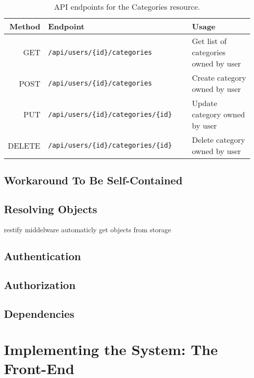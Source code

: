 		\begin{table}
			\begin{tabularx}{\textwidth}{ R{0.2} | L{0.6} | L{0.2} }
				\hline
				\textbf{Method} 	& \textbf{Endpoint} 									& \textbf{Usage} 			\\
				\hline
				GET 				& \verb=/api/users/{id}/categories 			  		= & Get list of categories owned by user 	\\
				POST 				& \verb=/api/users/{id}/categories 			  		= & Create category owned by user 		\\
				PUT 				& \verb=/api/users/{id}/categories/{id} 		  	= & Update category owned by user 		\\
				DELETE 				& \verb=/api/users/{id}/categories/{id} 		  	= & Delete category owned by user 		\\
			\end{tabularx}
			\caption{API endpoints for the Categories resource.}
			\label{tab:api:categories}
		\end{table}




	\section{Workaround To Be Self-Contained}
	
	\section{Resolving Objects}
		restify middelware automaticly get objects from storage

	\section{Authentication}

	\section{Authorization}



	\section{Dependencies}


\chapter{Implementing the System: The Front-End}

